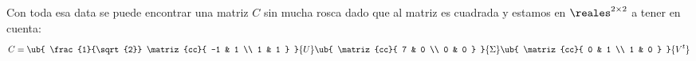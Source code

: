 \begin{enumerate}[label=(\alph*)]
        Con toda esa data se puede encontrar una matriz $C$ sin mucha rosca dado que al matriz es cuadrada y estamos
        en $\reales^{2 \times 2}$ a tener en cuenta:
        $$
          C =
          \ub{
            \frac{1}{\sqrt{2}}
            \matriz{cc}{
              -1 & 1 \\
              1 & 1
            }
          }{
            U
          }
          \ub{
            \matriz{cc}{
              7 & 0 \\
              0 & 0
            }
          }{
            \Sigma
          }
          \ub{
            \matriz{cc}{
              0 & 1 \\
              1 & 0
            }
          }{
            V^t
          }
        $$
\end{enumerate}
